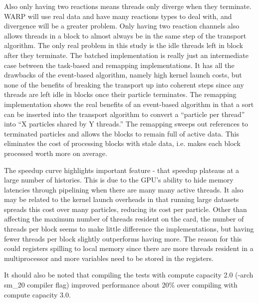Also only having two reactions means threads only diverge when they terminate.  WARP will use real data and have many reactions types to deal with, and divergence will be a greater problem.  Only having two reaction channels also allows threads in a block to almost always be in the same step of the transport algorithm.  The only real problem in this study is the idle threads left in block after they terminate.  The batched implementation is really just an intermediate case between the task-based and remapping implementations.  It has all the drawbacks of the event-based algorithm, namely high kernel launch costs, but none of the benefits of breaking the transport up into coherent steps since any threads are left idle in blocks once their particle terminates.  The remapping implementation shows the real benefits of an event-based algorithm in that a sort can be inserted into the transport algorithm to convert a ``particle per thread'' into ``X particles shared by Y threads.''  The remapping sweeps out references to terminated particles and allows the blocks to remain full of active data.  This eliminates the cost of processing blocks with stale data, i.e. makes each block processed worth more on average.   

The speedup curve highlights important feature - that speedup plateaus at a large number of histories.  This is due to the GPU's ability to hide memory latencies through pipelining when there are many many active threads.  It also may be related to the kernel launch overheads in that running large datasets spreads this cost over many particles, reducing its cost per particle.  Other than affecting the maximum number of threads resident on the card, the number of threads per block seems to make little difference the implementations, but having fewer threads per block slightly outperforms having more.  The reason for this could registers spilling to local memory since there are more threads resident in a multiprocessor and more variables need to be stored in the registers.

It should also be noted that compiling the tests with compute capacity 2.0 (-arch sm\_20 compiler flag) improved performance about 20\% over compiling with compute capacity 3.0.

